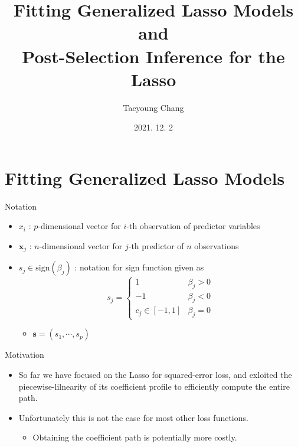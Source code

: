 \documentclass[11pt]{beamer}
\title[Section 16.5 - 16.6]{Fitting Generalized Lasso Models and \\ Post-Selection Inference for the Lasso
}
\author{
Taeyoung Chang
}
\date{2021. 12. 2}
\begin{document}
\begin{frame}
  \titlepage
\end{frame}


\section{Fitting Generalized Lasso Models}

\begin{frame}{Notation}
\begin{itemize}
    \item $x_i$ : $p$-dimensional vector for $i$-th observation of predictor variables
    \item $\mathbf{x}_j$ : $n$-dimensional vector for $j$-th predictor of $n$ observations
    \item $s_j\in \text{sign}(\beta_j)$ : notation for sign function given as
    $$s_j=\begin{cases}
        1 & \beta_j>0 \\ -1 & \beta_j<0 \\ c_j \in [-1,1] & \beta_j=0
    \end{cases} $$
    \begin{itemize}
        \item $\mathbf{s} = (s_1, \cdots, s_p)$
    \end{itemize}
\end{itemize}
\end{frame}

\begin{frame}{Motivation}
\begin{itemize}
    \item So far we have focused on the Lasso for squared-error loss, and exloited the piecewise-lilnearity of its coefficient profile to efficiently compute the entire path.
    \item Unfortunately this is not the case for most other loss functions.
    \begin{itemize}
        \item Obtaining the coefficient path is potentially more costly.
    \end{itemize}
\end{itemize}
\end{frame}
\end{document}
